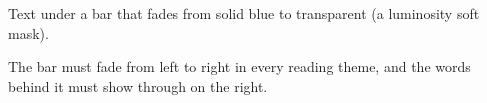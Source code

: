 \documentclass{article}
\begin{document}
Text under a bar that fades from solid blue to transparent (a luminosity soft mask).

\bigskip
{}

\bigskip
The bar must fade from left to right in every reading theme, and the words behind it must show through on the right.
\end{document}
